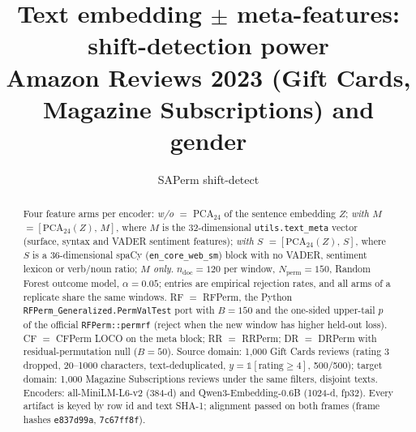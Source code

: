 \documentclass[11pt]{article}
\title{Text embedding $\pm$ meta-features: shift-detection power\\
{\large Amazon Reviews 2023 (Gift Cards, Magazine Subscriptions) and gender}}
\author{SAPerm shift-detect}
\date{}
\begin{document}
\maketitle

\begin{abstract}
\noindent
Four feature arms per encoder: \emph{w/o} $=$ PCA$_{24}$ of the sentence embedding $Z$;
\emph{with $M$} $=[\mathrm{PCA}_{24}(Z),\,M]$, where $M$ is the 32-dimensional
\texttt{utils.text\_meta} vector (surface, syntax and VADER sentiment features);
\emph{with $S$} $=[\mathrm{PCA}_{24}(Z),\,S]$, where $S$ is a 36-dimensional spaCy
(\texttt{en\_core\_web\_sm}) block with no VADER, sentiment lexicon or verb/noun ratio;
\emph{$M$ only}. $n_{\mathrm{doc}}{=}120$ per window, $N_{\mathrm{perm}}{=}150$,
Random Forest outcome model, $\alpha{=}0.05$; entries are empirical rejection rates, and all arms
of a replicate share the same windows.
RF $=$ RFPerm, the Python \texttt{RFPerm\_Generalized.PermValTest} port with $B{=}150$ and
the one-sided upper-tail $p$ of the official \texttt{RFPerm::permrf}
(reject when the new window has higher held-out loss).
CF $=$ CFPerm LOCO on the meta block; RR $=$ RRPerm; DR $=$ DRPerm with residual-permutation null ($B{=}50$).
Source domain: 1{,}000 Gift Cards reviews (rating 3 dropped, 20--1000 characters,
text-deduplicated, $y=\mathbb{1}[\text{rating}\ge4]$, 500/500); target domain:
1{,}000 Magazine Subscriptions reviews under the same filters, disjoint texts.
Encoders: all-MiniLM-L6-v2 (384-d) and Qwen3-Embedding-0.6B (1024-d, fp32).
Every artifact is keyed by row id and text SHA-1; alignment passed on both frames
(frame hashes \texttt{e837d99a}, \texttt{7c67ff8f}).
\end{abstract}
\end{document}

